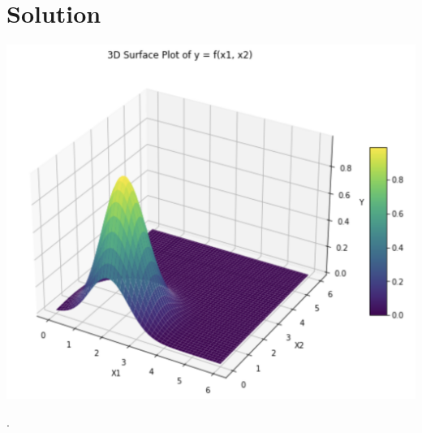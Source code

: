 \documentclass{harvardml}
\theoremstyle{definition}
\theoremstyle{plain}
\newenvironment{solution}
  {\color{blue}\section*{Solution}}
{}
\begin{document}
\begin{solution}
\begin{enumerate}
\begin{center}
        \includegraphics[scale=0.45]{2.3.png}
    \end{center}.
\end{enumerate}
\end{solution}


\color{black}
\end{document}
